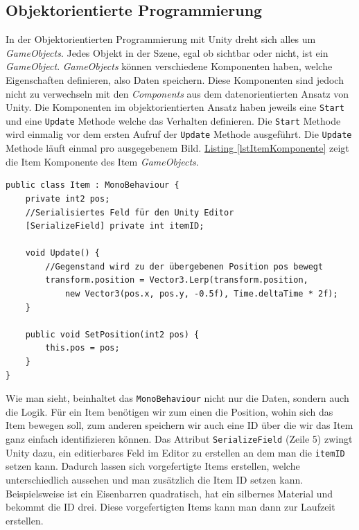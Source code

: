 \subsection{Objektorientierte Programmierung}
In der Objektorientierten Programmierung mit Unity dreht sich alles um \textit{GameObjects}. Jedes Objekt in der Szene, egal ob sichtbar oder nicht, ist ein \textit{GameObject}. \textit{GameObjects} können verschiedene Komponenten haben, welche Eigenschaften definieren, also Daten speichern. Diese Komponenten sind jedoch nicht zu verwechseln mit den \textit{Components} aus dem datenorientierten Ansatz von Unity. Die Komponenten im objektorientierten Ansatz haben jeweils eine \texttt{Start} und eine \texttt{Update} Methode welche das Verhalten definieren. Die \texttt{Start} Methode wird einmalig vor dem ersten Aufruf der \texttt{Update} Methode ausgeführt. Die \texttt{Update} Methode läuft einmal pro ausgegebenem Bild. \hyperref[lstItemKomponente]{Listing \ref*{lstItemKomponente}} zeigt die Item Komponente des Item \textit{GameObjects}.
\begin{lstlisting}[style=code, caption={[Item Komponente im objektorientierten Ansatz]Item Komponente im objektorientierten Ansatz. Es speichert die Position und seine ID. In der \texttt{Update} Methode bewegt sich das Item linear zu der übergebenen Position.}, label=lstItemKomponente]
public class Item : MonoBehaviour {
    private int2 pos;
    //Serialisiertes Feld für den Unity Editor
    [SerializeField] private int itemID;

    void Update() {
    	//Gegenstand wird zu der übergebenen Position pos bewegt
        transform.position = Vector3.Lerp(transform.position,
            new Vector3(pos.x, pos.y, -0.5f), Time.deltaTime * 2f);
    }

    public void SetPosition(int2 pos) {
        this.pos = pos;
    }
}
\end{lstlisting}
Wie man sieht, beinhaltet das \texttt{MonoBehaviour} nicht nur die Daten, sondern auch die Logik. Für ein Item benötigen wir zum einen die Position, wohin sich das Item bewegen soll, zum anderen speichern wir auch eine ID über die wir das Item ganz einfach identifizieren können. Das Attribut \texttt{SerializeField} (Zeile 5) zwingt Unity dazu, ein editierbares Feld im Editor zu erstellen an dem man die \texttt{itemID} setzen kann. Dadurch lassen sich vorgefertigte Items erstellen, welche unterschiedlich aussehen und man zusätzlich die Item ID setzen kann. Beispielsweise ist ein Eisenbarren quadratisch, hat ein silbernes Material und bekommt die ID drei. Diese vorgefertigten Items kann man dann zur Laufzeit erstellen.
